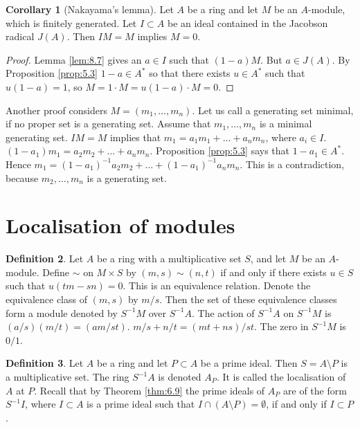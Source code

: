 \documentclass{article}
\newcommand{\rb}[1]{\left( #1 \right)}
\theoremstyle{definition}\newtheorem{definition}{Definition}[section]
\theoremstyle{definition}\newtheorem{remark}[definition]{Remark}
\theoremstyle{definition}\newtheorem*{example}{Example}
\theoremstyle{definition}\newtheorem*{note}{Note}
\newtheorem{corollary}[definition]{Corollary}
\begin{document}

\begin{corollary}[Nakayama's lemma]
Let $ A $ be a ring and let $ M $ be an $ A $-module, which is finitely generated. Let $ I \subset A $ be an ideal contained in the Jacobson radical $ J\rb{A} $. Then $ IM = M $ implies $ M = 0 $.
\end{corollary}

\begin{proof}
Lemma \ref{lem:8.7} gives an $ a \in I $ such that $ \rb{1 - a}M $. But $ a \in J\rb{A} $. By Proposition \ref{prop:5.3} $ 1 - a \in A^* $ so that there exists $ u \in A^* $ such that $ u\rb{1 - a} = 1 $, so $ M = 1 \cdot M  = u\rb{1 - a} \cdot M = 0 $.
\end{proof}

Another proof considers $ M = \rb{m_1, \dots, m_n} $. Let us call a generating set minimal, if no proper set is a generating set. Assume that $ m_1, \dots, m_n $ is a minimal generating set. $ IM = M $ implies that $ m_1 = a_1m_1 + \dots + a_nm_n $, where $ a_i \in I $. $ \rb{1 - a_1}m_1 = a_2m_2 + \dots + a_nm_n $. Proposition \ref{prop:5.3} says that $ 1 - a_1 \in A^* $. Hence $ m_1 = \rb{1 - a_1}^{-1}a_2m_2 + \dots + \rb{1 - a_1}^{-1}a_nm_n $. This is a contradiction, because $ m_2, \dots, m_n $ is a generating set.

\section{Localisation of modules}

\begin{definition}
Let $ A $ be a ring with a multiplicative set $ S $, and let $ M $ be an $ A $-module. Define $ \sim $ on $ M \times S $ by $ \rb{m, s} \sim \rb{n, t} $ if and only if there exists $ u \in S $ such that $ u\rb{tm - sn} = 0 $. This is an equivalence relation. Denote the equivalence class of $ \rb{m, s} $ by $ m / s $. Then the set of these equivalence classes form a module denoted by $ S^{-1}M $ over $ S^{-1}A $. The action of $ S^{-1}A $ on $ S^{-1}M $ is $ \rb{a / s}\rb{m / t} = \rb{am / st} $. $ m / s + n / t = \rb{mt + ns} / st $. The zero in $ S^{-1}M $ is $ 0 / 1 $.
\end{definition}

\begin{definition}
Let $ A $ be a ring and let $ P \subset A $ be a prime ideal. Then $ S = A \setminus P $ is a multiplicative set. The ring $ S^{-1}A $ is denoted $ A_P $. It is called the localisation of $ A $ at $ P $. Recall that by Theorem \ref{thm:6.9} the prime ideals of $ A_P $ are of the form $ S^{-1}I $, where $ I \subset A $ is a prime ideal such that $ I \cap \rb{A \setminus P} = \emptyset $, if and only if $ I \subset P $.
\end{definition}
\end{document}
